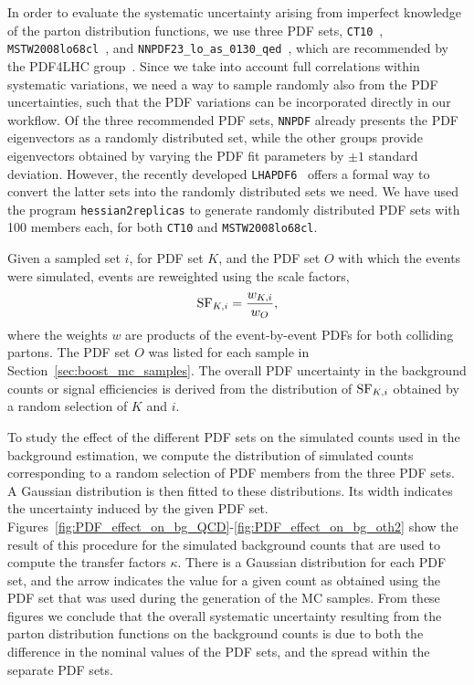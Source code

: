 In order to evaluate the systematic uncertainty arising from imperfect knowledge of the parton
distribution functions, we use three PDF sets, {\tt CT10}~\cite{Lai:2010vv}, {\tt
MSTW2008lo68cl}~\cite{Martin:2009iq},
 and {\tt NNPDF23\_lo\_as\_0130\_qed}~\cite{nnpdf}, which are
recommended by the PDF4LHC group~\cite{Alekhin:2011sk,Botje:2011sn}.  
Since we take into account full correlations within systematic variations, we need a way to sample
randomly also from the PDF uncertainties, such that the PDF variations can be incorporated directly
in our workflow. 
Of the three recommended PDF sets, {\tt NNPDF} already presents the PDF eigenvectors as a randomly
distributed set, while the other groups provide eigenvectors obtained by varying the PDF fit
parameters by $\pm 1$ standard deviation.  
However, the recently developed {\tt LHAPDF6}~\cite{LHAPDF6} offers a formal way to convert the
latter sets into the randomly distributed sets we need.  
We have used the program {\tt hessian2replicas} to generate randomly
distributed PDF sets with 100 members each, for both {\tt CT10} and {\tt MSTW2008lo68cl}.  

Given a sampled set $i$, for PDF set $K$, and the PDF set $O$ with which the events were simulated,
events are reweighted using the scale factors, 
\begin{equation}
{\rm SF}_{K, i} = \frac{w_{K, i}}{w_{O}},
\end{equation}
where the weights $w$ are products of the event-by-event PDFs for both colliding partons.
The PDF set $O$ was listed for each sample in Section~\ref{sec:boost_mc_samples}.
The overall PDF uncertainty in the background counts or signal efficiencies is derived
from the distribution of ${\rm SF}_{K, i}$ obtained by a random selection of $K$ and $i$.  

To study the effect of the different PDF sets on the simulated counts used in the background
estimation, we compute the distribution of simulated counts corresponding to a random selection of
PDF members from the three PDF sets. 
A Gaussian distribution is then fitted to these distributions. Its width indicates the uncertainty
induced by the given PDF set. 
Figures~\ref{fig:PDF_effect_on_bg_QCD}-\ref{fig:PDF_effect_on_bg_oth2} show the result of this
procedure for the simulated background counts that are used to compute the transfer factors
$\kappa$. 
There is a Gaussian distribution for each PDF set, and the arrow indicates the value for a given
count as obtained using the PDF set that was used during the generation of the MC samples. 
From these figures we conclude that the overall systematic uncertainty resulting from the parton
distribution functions on the background counts is due to both the difference in the nominal values
of the PDF sets, and the spread within the separate PDF sets.

